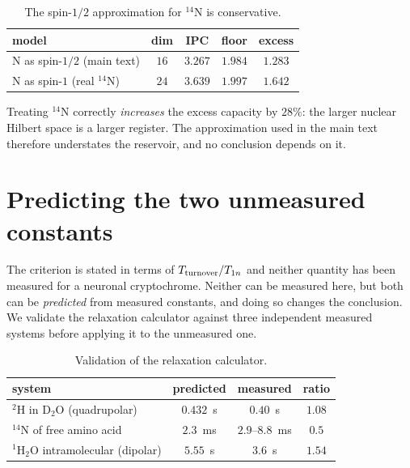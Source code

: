 \documentclass[aps,prx,reprint,superscriptaddress,nofootinbib,floatfix]{revtex4-2}
\begin{document}
\begin{table}[H]
\caption{\label{tab:spin1}The spin-$1/2$ approximation for $^{14}$N is conservative.}
\begin{ruledtabular}
\begin{tabular}{lcccc}
model & dim & IPC & floor & excess \\
\hline
N as spin-$1/2$ (main text) & $16$ & $3.267$ & $1.984$ & $1.283$ \\
N as spin-$1$ (real $^{14}$N) & $24$ & $3.639$ & $1.997$ & $\mathbf{1.642}$ \\
\end{tabular}
\end{ruledtabular}
\end{table}

Treating $^{14}$N correctly \emph{increases} the excess capacity by $28\%$: the
larger nuclear Hilbert space is a larger register. The approximation used in the
main text therefore understates the reservoir, and no conclusion depends on it.

\section{Predicting the two unmeasured constants}
\label{sec:predict}
The criterion is stated in terms of $T_{\rm turnover}/T_{1n}$ and neither quantity
has been measured for a neuronal cryptochrome. Neither can be measured here, but
both can be \emph{predicted} from measured constants, and doing so changes the
conclusion. We validate the relaxation calculator against three independent
measured systems before applying it to the unmeasured one.

\begin{table}[H]
\caption{\label{tab:valid}Validation of the relaxation calculator.}
\begin{ruledtabular}
\begin{tabular}{lccc}
system & predicted & measured & ratio \\
\hline
$^2$H in D$_2$O (quadrupolar) & $0.432$~s & $0.40$~s & $1.08$ \\
$^{14}$N of free amino acid & $2.3$~ms & $2.9$--$8.8$~ms & $0.5$ \\
$^1$H$_2$O intramolecular (dipolar) & $5.55$~s & $3.6$~s\footnotemark[1] & $1.54$ \\
\end{tabular}
\end{ruledtabular}
\end{table}
\end{document}
